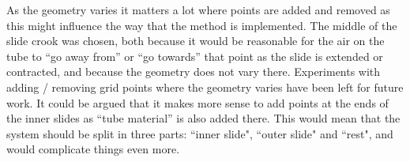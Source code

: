 As the geometry varies it matters a lot where points are added and removed as this might influence the way that the method is implemented.  The middle of the slide crook was chosen, both because it would be reasonable for the air on the tube to ``go away from'' or ``go towards'' that point as the slide is extended or contracted, and because the geometry does not vary there. Experiments with adding / removing grid points where the geometry varies have been left for future work.  It could be argued that it makes more sense to add points at the ends of the inner slides as ``tube material'' is also added there. This would mean that the system should be split in three parts: ``inner slide", ``outer slide" and ``rest", and would complicate things even more.


